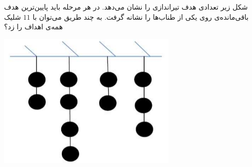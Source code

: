 \EXERCISE
شکل زیر تعدادی هدف تیراندازی را نشان می‌دهد. در هر مرحله باید پایین‌ترین هدف باقی‌مانده‌ی روی یکی از طناب‌ها را نشانه گرفت. به چند طریق می‌توان با
$11$
شلیک همه‌ی اهداف را زد؟
\begin{center}
\includegraphics[height=6.5cm]{24.png}
\end{center}